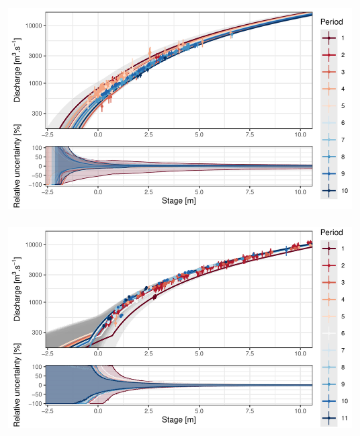 \documentclass[11pt]{article}
\begin{document}
    \begin{figure}[h!]
    \centering
        \begin{subfigure}{0.49\textwidth}
            \centering
            \includegraphics[width=\linewidth]{Figs/7a-RClog_ICdownPt.pdf}
            \caption{}
            \label{subfig:RcPt}
        \end{subfigure}
        \begin{subfigure}{0.49\textwidth}
            \centering
            \includegraphics[width=\linewidth]{Figs/7b-RClog_ICdownRes.pdf}
            \caption{}
            \label{subfig:RcRes}
        \end{subfigure}
        

\end{figure}
\end{document}
